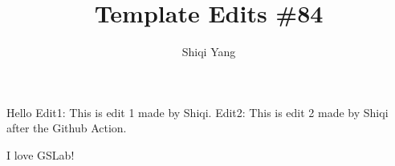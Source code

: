 \documentclass{report}
\title{\Huge{Template Edits \#84}\\}
\author{\huge{Shiqi Yang}}
\date{}
\begin{document}
\maketitle
Hello
Edit1: This is edit 1 made by Shiqi.
Edit2: This is edit 2 made by Shiqi after the Github Action.


I love GSLab!
\end{document}
